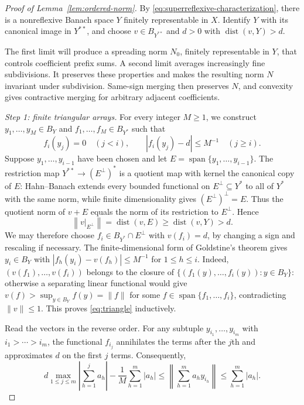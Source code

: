 \documentclass[11pt]{article}
\theoremstyle{definition}
\theoremstyle{remark}
\newcommand{\norm}[1]{\left\lVert #1\right\rVert}
\newcommand{\abs}[1]{\left\lvert #1\right\rvert}
\newcommand{\dist}{\operatorname{dist}}
\newcommand{\Span}{\operatorname{span}}
\begin{document}
\begin{proof}[Proof of Lemma~\ref{lem:ordered-norm}]
By \eqref{eq:superreflexive-characterization}, there is a nonreflexive
Banach space $Y$ finitely representable in $X$. Identify $Y$ with its
canonical image in $Y^{**}$, and choose
$v\in B_{Y^{**}}$ and $d>0$ with $\dist(v,Y)>d$.

The first limit will produce a spreading norm $N_0$, finitely representable
in $Y$, that controls coefficient prefix sums. A second limit averages
increasingly fine subdivisions. It preserves these properties and makes
the resulting norm $N$ invariant under subdivision. Same-sign merging
then preserves $N$, and convexity gives contractive merging for arbitrary
adjacent coefficients.

\par\smallskip
{}
\noindent\emph{Step 1: finite triangular arrays.}
For every integer $M\geq1$, we construct
$y_1,\ldots,y_M\in B_Y$ and $f_1,\ldots,f_M\in B_{Y^*}$ such that
\begin{equation}\label{eq:triangle}
 f_i(y_j)=0\quad(j<i),\qquad
 |f_i(y_j)-d|\leq M^{-1}\quad(j\geq i).
\end{equation}
Suppose $y_1,\ldots,y_{i-1}$ have been chosen and let
$E=\Span\{y_1,\ldots,y_{i-1}\}$. The restriction map
$Y^{**}\to(E^\perp)^*$ is a quotient map with kernel the canonical
copy of $E$: Hahn--Banach extends every bounded functional on
$E^\perp\subseteq Y^*$ to all of $Y^*$ with the same norm, while finite
dimensionality gives
$(E^\perp)^\perp=E$. Thus the quotient norm of $v+E$ equals the norm
of its restriction to $E^\perp$. Hence
\[
 \norm{v|_{E^\perp}}=\dist(v,E)\geq\dist(v,Y)>d.
\]
We may therefore choose $f_i\in B_{Y^*}\cap E^\perp$ with $v(f_i)=d$,
by changing a sign and rescaling if necessary.
The finite-dimensional form of Goldstine's theorem gives
$y_i\in B_Y$ with $|f_h(y_i)-v(f_h)|\leq M^{-1}$ for $1\leq h\leq i$.
Indeed, $(v(f_1),\ldots,v(f_i))$ belongs to the closure of
$\{(f_1(y),\ldots,f_i(y)):y\in B_Y\}$: otherwise a separating linear
functional would give $v(f)>\sup_{y\in B_Y}f(y)=\|f\|$ for some
$f\in\Span\{f_1,\ldots,f_i\}$, contradicting $\|v\|\leq1$.
This proves \eqref{eq:triangle} inductively.

Read the vectors in the reverse order. For any subtuple
$y_{i_1},\ldots,y_{i_m}$ with $i_1>\cdots>i_m$, the functional $f_{i_j}$
annihilates the terms after the $j$th and approximates $d$ on the first
$j$ terms. Consequently,
\begin{equation}\label{eq:finite-prefix}
 d\max_{1\leq j\leq m}\abs{\sum_{h=1}^j a_h}
 -\frac1M\sum_{h=1}^m|a_h|
 \leq\norm{\sum_{h=1}^m a_h y_{i_h}}
 \leq\sum_{h=1}^m|a_h|.
\end{equation}


\end{proof}
\end{document}
